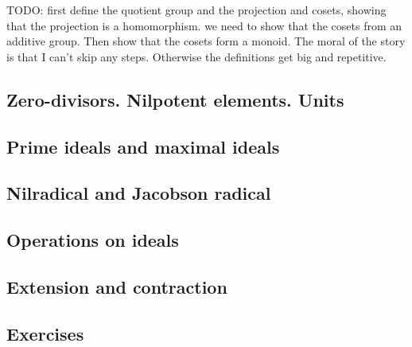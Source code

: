 \documentclass{amsart}
\begin{document}
TODO: first define the quotient group and the projection and cosets, showing that the projection
is a homomorphism. we need to show that the cosets from an additive group.
Then show that the cosets form a monoid.
The moral of the story is that I can't skip any steps. Otherwise the definitions get big and repetitive.

\subsection{Zero-divisors. Nilpotent elements. Units}

\subsection{Prime ideals and maximal ideals}

\subsection{Nilradical and Jacobson radical}

\subsection{Operations on ideals}

\subsection{Extension and contraction}

\subsection{Exercises}

\printbibliography
\end{document}
